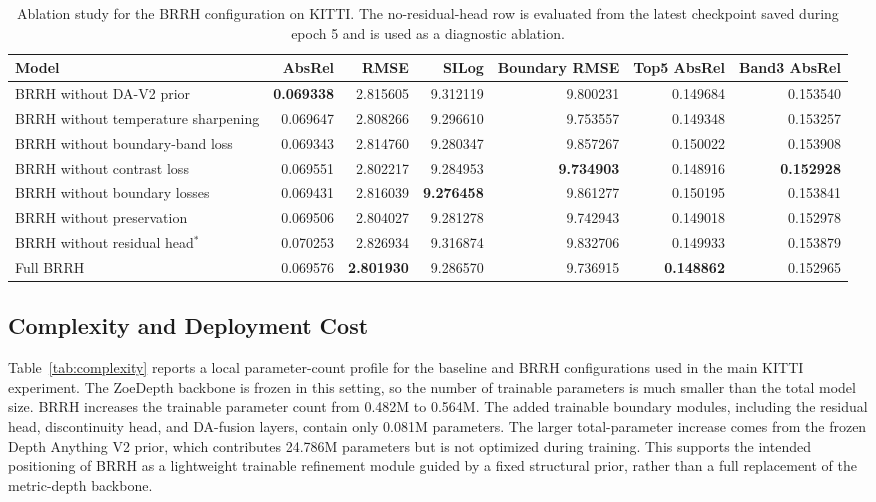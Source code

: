 \documentclass{ieeeaccess}
\begin{document}
\begin{table}[t]
\centering
\small
\caption{Ablation study for the BRRH configuration on KITTI. The no-residual-head row is evaluated from the latest checkpoint saved during epoch 5 and is used as a diagnostic ablation.}
\label{tab:ablation}
\begin{tabular}{lrrrrrr}
\toprule
Model & AbsRel & RMSE & SILog & Boundary RMSE & Top5 AbsRel & Band3 AbsRel \\
\midrule
BRRH without DA-V2 prior & \textbf{0.069338} & 2.815605 & 9.312119 & 9.800231 & 0.149684 & 0.153540 \\
BRRH without temperature sharpening & 0.069647 & 2.808266 & 9.296610 & 9.753557 & 0.149348 & 0.153257 \\
BRRH without boundary-band loss & 0.069343 & 2.814760 & 9.280347 & 9.857267 & 0.150022 & 0.153908 \\
BRRH without contrast loss & 0.069551 & 2.802217 & 9.284953 & \textbf{9.734903} & 0.148916 & \textbf{0.152928} \\
BRRH without boundary losses & 0.069431 & 2.816039 & \textbf{9.276458} & 9.861277 & 0.150195 & 0.153841 \\
BRRH without preservation & 0.069506 & 2.804027 & 9.281278 & 9.742943 & 0.149018 & 0.152978 \\
BRRH without residual head$^*$ & 0.070253 & 2.826934 & 9.316874 & 9.832706 & 0.149933 & 0.153879 \\
Full BRRH & 0.069576 & \textbf{2.801930} & 9.286570 & 9.736915 & \textbf{0.148862} & 0.152965 \\
\bottomrule
\end{tabular}
\end{table}

\subsection{Complexity and Deployment Cost}

Table~\ref{tab:complexity} reports a local parameter-count profile for the baseline and BRRH configurations used in the main KITTI experiment. The ZoeDepth backbone is frozen in this setting, so the number of trainable parameters is much smaller than the total model size. BRRH increases the trainable parameter count from 0.482M to 0.564M. The added trainable boundary modules, including the residual head, discontinuity head, and DA-fusion layers, contain only 0.081M parameters. The larger total-parameter increase comes from the frozen Depth Anything V2 prior, which contributes 24.786M parameters but is not optimized during training. This supports the intended positioning of BRRH as a lightweight trainable refinement module guided by a fixed structural prior, rather than a full replacement of the metric-depth backbone.
\end{document}
